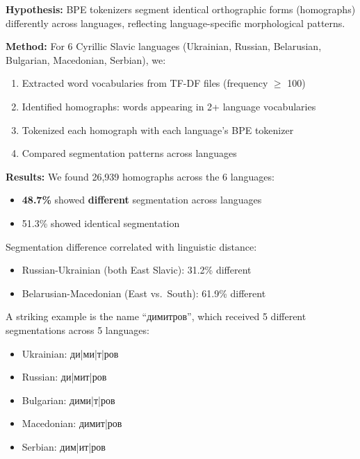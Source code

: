\documentclass[11pt]{article}
\begin{document}
\textbf{Hypothesis:} BPE tokenizers segment identical orthographic forms (homographs) differently across languages, reflecting language-specific morphological patterns.

\textbf{Method:} For 6 Cyrillic Slavic languages (Ukrainian, Russian, Belarusian, Bulgarian, Macedonian, Serbian), we:
\begin{enumerate}[noitemsep]
    \item Extracted word vocabularies from TF-DF files (frequency $\geq$ 100)
    \item Identified homographs: words appearing in 2+ language vocabularies
    \item Tokenized each homograph with each language's BPE tokenizer
    \item Compared segmentation patterns across languages
\end{enumerate}

\textbf{Results:} We found 26,939 homographs across the 6 languages:
\begin{itemize}[noitemsep]
    \item \textbf{48.7\%} showed \textbf{different} segmentation across languages
    \item 51.3\% showed identical segmentation
\end{itemize}

Segmentation difference correlated with linguistic distance:
\begin{itemize}[noitemsep]
    \item Russian-Ukrainian (both East Slavic): 31.2\% different
    \item Belarusian-Macedonian (East vs.\ South): 61.9\% different
\end{itemize}

A striking example is the name {\selectfont ``димитров''}, which received 5 different segmentations across 5 languages:
\begin{itemize}[noitemsep]
    \item Ukrainian: {\selectfont ди|ми|т|ров}
    \item Russian: {\selectfont ди|мит|ров}
    \item Bulgarian: {\selectfont дими|т|ров}
    \item Macedonian: {\selectfont димит|ров}
    \item Serbian: {\selectfont дим|ит|ров}
\end{itemize}
\end{document}
